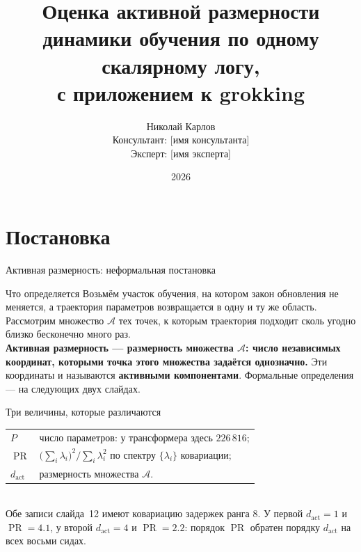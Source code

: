 \documentclass[aspectratio=169, 11pt]{beamer}
\title[Активная размерность обучения]{Оценка активной размерности динамики
обучения по одному скалярному логу,\\ с приложением к grokking}
\author{
    Николай Карлов\\
    Консультант: [имя консультанта]\\
    Эксперт: [имя эксперта]
}
\institute{
    Кафедра интеллектуальных систем, МФТИ\\
    По материалам статьи на ICOMP 2026
}
\date{2026}
\newcommand{\gA}{\mathcal{A}}
\newcommand{\PR}{\operatorname{PR}}
\newcommand{\dact}{d_{\mathrm{act}}}
\begin{document}
\begin{frame}
    \thispagestyle{empty}
    \maketitle
\end{frame}

\section{Постановка}

\begin{frame}{Активная размерность: неформальная постановка}
    \begin{block}{Что определяется}
        \small
        Возьмём участок обучения, на котором закон обновления не меняется, а
        траектория параметров возвращается в одну и ту же область. Рассмотрим
        множество $\gA$ тех точек, к которым траектория подходит сколь угодно
        близко бесконечно много раз.
        \\[0.7mm]
        \alert{\textbf{Активная размерность --- размерность множества $\gA$:
        число независимых координат, которыми точка этого множества задаётся
        однозначно.}} Эти координаты и называются \textbf{активными
        компонентами}. Формальные определения --- на следующих двух слайдах.
    \end{block}

    \begin{block}{Три величины, которые различаются}
        \small
        \begin{tabular}{@{}l@{\ ---\ }l@{}}
          $P$        & число параметров: у трансформера здесь $226\,816$;\\
          $\PR$      & $\bigl(\sum_i \lambda_i\bigr)^2 \big/ \sum_i \lambda_i^2$
                       по спектру $\{\lambda_i\}$ ковариации;\\
          $\dact$    & размерность множества $\gA$.\\
        \end{tabular}
        \\[0.5mm]
        Обе записи слайда~12 имеют ковариацию задержек ранга $8$. У первой
        $\dact = 1$ и $\PR = 4.1$, у второй $\dact = 4$ и $\PR = 2.2$:
        \alert{порядок $\PR$ обратен порядку $\dact$} на всех восьми сидах.
    \end{block}
\end{frame}
\end{document}
